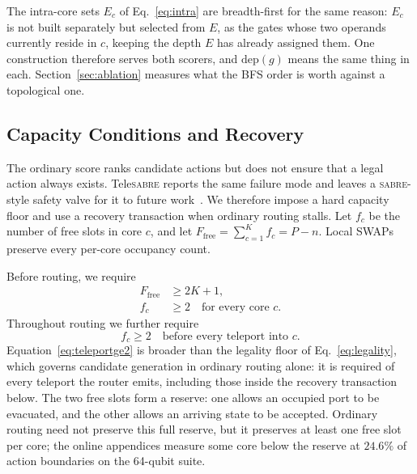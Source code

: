\documentclass[journal]{IEEEtran}
\newcommand{\TeleSABRE}{Tele\textsc{sabre}}
\newcommand{\SABRE}{\textsc{sabre}}
\begin{document}
The intra-core sets $E_c$ of Eq.~\eqref{eq:intra} are breadth-first for the same reason: $E_c$ is not built separately but selected from $E$, as the gates whose two operands currently reside in $c$, keeping the depth $E$ has already assigned them. One construction therefore serves both scorers, and $\mathrm{dep}(g)$ means the same thing in each. Section~\ref{sec:ablation} measures what the BFS order is worth against a topological one.

\subsection{Capacity Conditions and Recovery}
\label{sec:relief}
\label{sec:recovery}

The ordinary score ranks candidate actions but does not ensure that a legal action always exists. \TeleSABRE{} reports the same failure mode and leaves a \SABRE{}-style safety valve for it to future work~\cite{russo2025telesabre}. We therefore impose a hard capacity floor and use a recovery transaction when ordinary routing stalls. Let $f_c$ be the number of free slots in core $c$, and let  $F_{\mathrm{free}}=\sum_{c=1}^{K} f_c=P-n$. 
 Local SWAPs preserve every per-core occupancy count. 
 

Before routing, we require 
\begin{align}
F_{\mathrm{free}}&\geq 2K+1, \label{eq:feasible}\\
f_c&\geq 2 \quad\text{for every core }c.\label{eq:invariant}
\end{align}
Throughout routing we further require
\begin{equation}
f_c\geq 2 \quad\text{before every teleport into }c.
\label{eq:teleportge2}
\end{equation} 
Equation~\eqref{eq:teleportge2} is broader than the legality floor of Eq.~\eqref{eq:legality}, which governs candidate generation in ordinary routing alone: it is required of every teleport the router emits, including those inside the recovery transaction below. The two free slots form a reserve: one allows an occupied port to be evacuated, and the other allows an arriving state to be accepted. Ordinary routing need not preserve this full reserve, but it preserves at least one free slot per core; the online appendices measure some core below the reserve at $24.6\%$ of action boundaries on the 64-qubit suite. 
\end{document}
